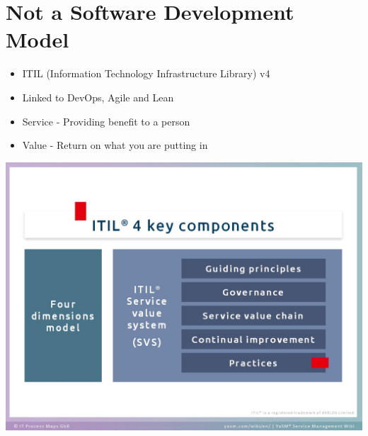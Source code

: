 \documentclass{article}[18pt]
\begin{document}
\section{Not a Software Development Model}
\begin{itemize}
	\item ITIL (Information Technology Infrastructure Library) v4
	\item Linked to DevOps, Agile and Lean
	\item Service - Providing benefit to a person
	\item Value - Return on what you are putting in
\end{itemize}
\begin{center}
	\includegraphics[scale=0.7]{ITIL}
\end{center}
\end{document}
